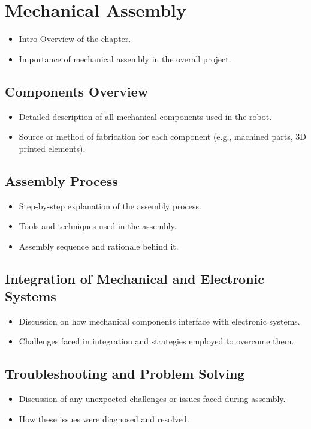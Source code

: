\chapter{Mechanical Assembly}

\graphicspath{{./Figures/Modeling}}

\begin{itemize}
	\item Intro Overview of the chapter.
	\item Importance of mechanical assembly in the overall project.
\end{itemize}


\section{Components Overview}
\begin{itemize}
\item Detailed description of all mechanical components used in the robot.
\item Source or method of fabrication for each component (e.g., machined parts, 3D printed elements).
\end{itemize}
\section{Assembly Process}
\begin{itemize}
\item Step-by-step explanation of the assembly process.
\item Tools and techniques used in the assembly.
\item Assembly sequence and rationale behind it.
\end{itemize}
\section{Integration of Mechanical and Electronic Systems}
\begin{itemize}
\item Discussion on how mechanical components interface with electronic systems.
\item Challenges faced in integration and strategies employed to overcome them.
\end{itemize}
\section{Troubleshooting and Problem Solving}
\begin{itemize}
\item Discussion of any unexpected challenges or issues faced during assembly.
\item How these issues were diagnosed and resolved.
\end{itemize}
